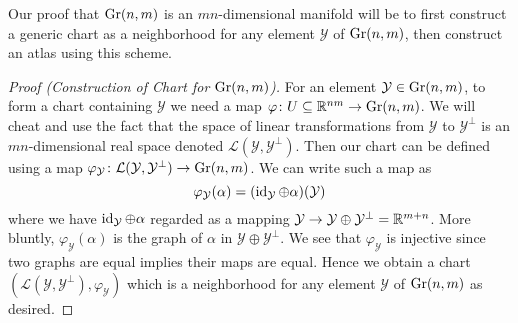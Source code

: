 Our proof that $\operatorname{Gr}(n,m)$ is an $mn$-dimensional manifold will be
to first construct a generic chart as a neighborhood for any element
$\mathcal{Y}$ of $\operatorname{Gr}(n,m)$, then construct an atlas using this scheme.

\begin{proof}[Proof (Construction of Chart for $\operatorname{Gr}(n,m)$)]
For an element $\mathcal{Y}\in\operatorname{Gr}(n,m)$, to form a chart
containing $\mathcal{Y}$ we need a map
$\varphi\colon U\subseteq\mathbb{R}^{nm}\to\operatorname{Gr}(n,m)$. We will cheat and
use the fact that the space of linear transformations from $\mathcal{Y}$
to $\mathcal{Y}^{\bot}$ is an $mn$-dimensional real space denoted
$\mathcal{L}(\mathcal{Y},\mathcal{Y}^{\bot})$. Then our chart can be
defined using a map $\varphi_{\mathcal{Y}}\colon\mathcal{L}(\mathcal{Y},\mathcal{Y}^{\bot})\to\operatorname{Gr}(n,m)$.
We can write such a map as
\begin{equation}
\varphi_{\mathcal{Y}}(\alpha) = (\operatorname{id}_{\mathcal{Y}}\oplus\alpha)(\mathcal{Y})
\end{equation}
where we have $\operatorname{id}_{\mathcal{Y}}\oplus\alpha$ regarded as a mapping
$\mathcal{Y}\to\mathcal{Y}\oplus\mathcal{Y}^{\bot}=\mathbb{R}^{m+n}$. More
bluntly, $\varphi_{\mathcal{Y}}(\alpha)$ is the graph of $\alpha$ in
$\mathcal{Y}\oplus\mathcal{Y}^{\bot}$. We see that $\varphi_{\mathcal{Y}}$
is injective since two graphs are equal implies their maps are equal.
Hence we obtain a chart $(\mathcal{L}(\mathcal{Y},\mathcal{Y}^{\bot}),\varphi_{\mathcal{Y}})$
which is a neighborhood for any element $\mathcal{Y}$ of $\operatorname{Gr}(n,m)$
as desired.
\end{proof}

